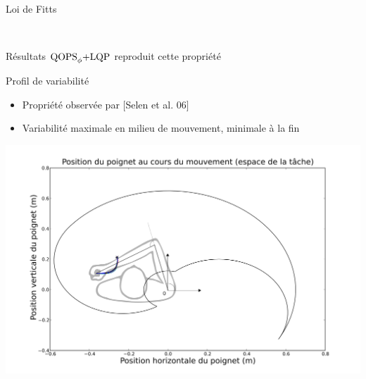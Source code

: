 \begin{frame}{Loi de Fitts}
    \begin{figure}
        \centering
        ~~~
    \end{figure}
    \begin{block}{Résultats}
        $\text{QOPS}_\phi\text{+LQP}$ reproduit cette propriété
    \end{block}
\end{frame}

\begin{frame}{Profil de variabilité}
    \begin{small}
        \begin{itemize}
            \item Propriété observée par $[$Selen et al. 06$]$
            \item Variabilité maximale en milieu de mouvement, minimale à la fin
        \end{itemize}
    \end{small}
    \begin{center}
        \includegraphics[width=.70\linewidth]{fig/lqp_variations_paths4}
    \end{center}
\end{frame}

